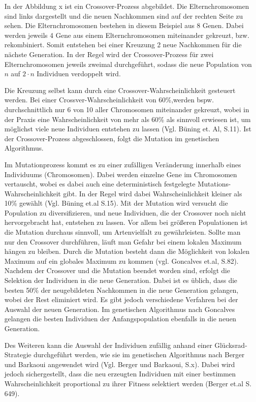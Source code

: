 \documentclass[a4paper,12pt,parskip,bibtotoc,liststotoc]{article}
\begin{document}
In der Abbildung x ist ein Crossover-Prozess abgebildet. 
Die Elternchromosomen sind links dargestellt und die neuen Nachkommen sind auf der rechten Seite zu sehen. 
Die Elternchromosomen bestehen in diesem Beispiel aus 8 Genen. Dabei werden jeweils 4 Gene aus einem Elternchromosomen miteinander gekreuzt, bzw. rekombiniert. 
Somit entstehen bei einer Kreuzung 2 neue Nachkommen für die nächste Generation. 
In der Regel wird der Crossover-Prozess für zwei Elternchromosomen jeweils zweimal durchgeführt, sodass die neue Population von $n$ auf $2\cdot n$ Individuen verdoppelt wird.

Die Kreuzung selbst kann durch eine Crossover-Wahrscheinlichkeit gesteuert werden. 
Bei einer Crossver-Wahrscheinlichkeit von 60\%,werden bspw. durchschnittlich nur 6 von 10 aller Chromosomen miteinander gekreuzt, wobei in der Praxis eine Wahrscheinlichkeit von mehr als 60\% als sinnvoll erwiesen ist, um möglichst viele neue Individuen entstehen zu lassen (Vgl. Büning et. Al, S.11).
Ist der Crossover-Prozess abgeschlossen, folgt die Mutation im genetischen Algorithmus.

Im Mutationprozess kommt es zu einer zufälligen Veränderung innerhalb eines Individuums (Chromosomen). 
Dabei werden einzelne Gene im Chromosomen vertauscht, wobei es dabei auch eine deterministisch festgelegte Mutations-Wahrscheinlichkeit gibt. 
In der Regel wird dabei Wahrscheinlichkeit kleiner als 10\% gewählt (Vgl. Büning et.al S.15).
Mit der Mutation wird versucht die Population zu diversifizieren, und neue Individuen, die der Crossover noch nicht hervorgebracht hat, entstehen zu lassen. Vor allem bei größeren Populationen ist die Mutation durchaus sinnvoll, um Artenvielfalt zu gewährleisten. Sollte man nur den Crossover durchführen, läuft man Gefahr bei einem lokalen Maximum hängen zu bleiben. Durch die Mutation besteht dann die Möglichkeit von lokalen Maximum auf ein globales Maximum zu kommen (vgl. Goncalves et.al, S.82).\\

Nachdem der Crossover und die Mutation beendet worden sind, erfolgt die Selektion der Individuen in die neue Generation. 
Dabei ist es üblich, dass die besten 50\% der neugebildeten Nachkommen in die neue Generation gelangen, wobei der Rest eliminiert wird. 
Es gibt jedoch verschiedene Verfahren bei der Auswahl der neuen Generation.
Im genetischen Algorithmus nach Goncalves gelangen die besten Individuen der Anfangspopulation ebenfalls in die neuen Generation.

Des Weiteren kann die Auswahl der Individuen zufällig anhand einer Glücksrad-Strategie durchgeführt werden, wie sie im genetischen Algorithmus nach Berger und Barkaoui angewendet wird (Vgl. Berger und Barkaoui, S.x).
Dabei wird jedoch sichergestellt, dass die neu erzeugten Individuen mit einer bestimmen Wahrscheinlichkeit proportional zu ihrer Fitness selektiert werden (Berger et.al S. 649).
\end{document}
